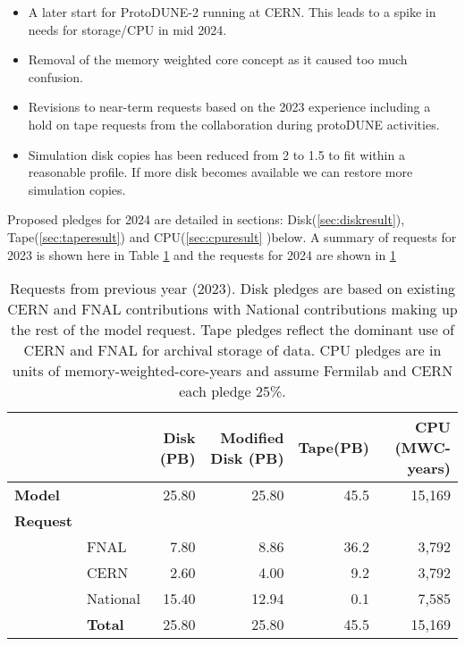 \documentclass[12pt]{article}
\begin{document}
\begin{itemize}
\item A later start for ProtoDUNE-2 running at CERN. This leads to a spike in needs for storage/CPU in mid 2024. 
\item Removal of the memory weighted core concept as it caused too much confusion. 
\item Revisions to near-term requests based on the 2023 experience including a hold on tape requests from the collaboration during protoDUNE activities. 
\item Simulation disk copies has been reduced from 2 to 1.5 to fit within a reasonable profile.  If more disk becomes available we can restore more simulation copies.  
\end{itemize}

Proposed pledges for 2024 are detailed  in sections: Disk(\ref{sec:diskresult}), Tape(\ref{sec:taperesult}) and CPU(\ref{sec:cpuresult} )below.   A summary of requests for 2023 is shown here in Table \ref{tab:summary2023} and the requests for 2024 are shown in \ref{tab:summary2023} 

\begin{table}[ht]
\begin{centering}

\begin{tabular}{|ll|rr|r|r|}
\hline
 	&&	Disk (PB)	&	Modified Disk (PB)	&	Tape(PB)	&	CPU (MWC-years)	\\
	\hline
{\bf Model}	&&	25.80	&	25.80	&	45.5	&	15,169	\\
\hline
{\bf Request}	&&		&		&		&		\\
&FNAL	&	7.80	&	8.86	&	36.2	&	3,792	\\
&CERN	&	2.60	&	4.00	&	9.2	&	3,792	\\
&National	&	15.40	&	12.94	&	0.1	&	7,585\\
\hline
&{\bf Total}	&	25.80	&	25.80	&	45.5	&	15,169	\\
\hline
\end{tabular}

\caption{Requests from previous year (2023).  Disk pledges are based on existing CERN and FNAL contributions with National contributions making up the rest of the model request.  Tape pledges reflect the dominant use of CERN and FNAL for archival storage of data.  CPU pledges are in units of memory-weighted-core-years and assume Fermilab and CERN each pledge 25\%.   }
\end{centering}
\label{tab:summary2023}
\end{table}
\end{document}
